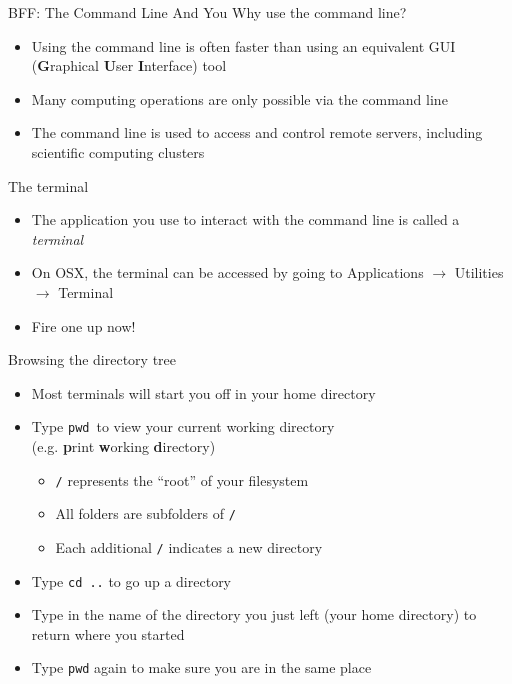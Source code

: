 \begin{frame}{BFF: The Command Line And You}
  Why use the command line?
  \begin{itemize}
  \item Using the command line is often faster than using an equivalent GUI
    (\textbf{G}raphical \textbf{U}ser \textbf{I}nterface) tool
  \item Many computing operations are only possible via the command line
  \item The command line is used to access and control remote servers,
    including scientific computing clusters
  \end{itemize}
\end{frame}

\begin{frame}{The terminal}
  \begin{itemize}
  \item The application you use to interact with the command line is called a
    \textit{terminal}
  \item On OSX, the terminal can be accessed by going to
    Applications $\rightarrow$ Utilities $\rightarrow$ Terminal
  \item Fire one up now!
  \end{itemize}
\end{frame}

\begin{frame}{Browsing the directory tree}
  \begin{itemize}
  \item Most terminals will start you off in your home directory
  \item Type \texttt{pwd}\ to view your current working directory\\
    (e.g. \textbf{p}rint \textbf{w}orking \textbf{d}irectory)
    \begin{itemize}
    \item \texttt{/} represents the ``root'' of your filesystem
    \item All folders are subfolders of \texttt{/}
    \item Each additional \texttt{/} indicates a new directory
    \end{itemize}
    \pause
  \item Type \texttt{cd ..} to go up a directory
  \item Type in the name of the directory you just left (your home directory)
    to return where you started
  \item Type \texttt{pwd} again to make sure you are in the same place
  \end{itemize}
\end{frame}

